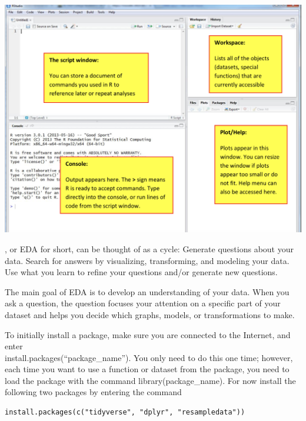 \begin{center}
\includegraphics[width=6.25in]{02/R-screen.png}
\end{center}

\clearpage


\bbox
\textbf{}, or EDA for short, can be thought of as a cycle:
\bb
\ii Generate questions about your data.
\ii Search for answers by visualizing, transforming, and modeling your data.
\ii Use what you learn to refine your questions and/or generate new questions.
\ee
\ebox

The main goal of EDA is to develop an understanding of your data.  When you ask a question, the question focuses your attention on a specific part of your dataset and helps you decide which graphs, models, or transformations to make.



To initially install a package, make sure you are connected to the Internet, and enter \\
install.packages(``package\_name'').  You only
need to do this one time; however, each time you want to use a function or dataset from the package, you need to load the package with the command library(package\_name). For now install the following two packages by entering the command

\bbox
\begin{lstlisting}
install.packages(c("tidyverse", "dplyr", "resampledata"))
\end{lstlisting}
\ebox

